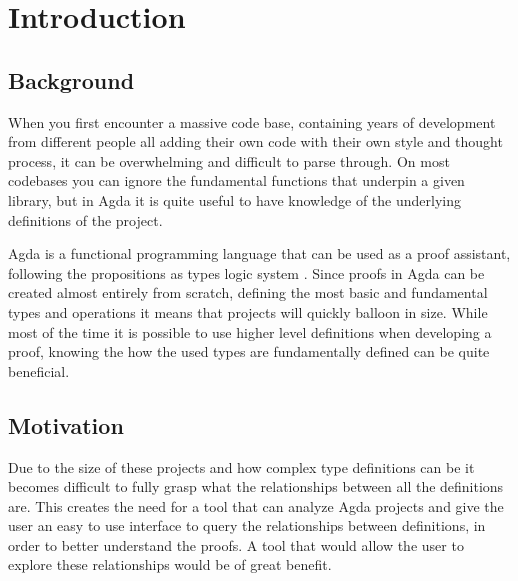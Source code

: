 
\chapter{Introduction}


\section{Background}

When you first encounter a massive code base, containing years of development
from different people all adding their own code with their own style and
thought process, it can be overwhelming and difficult to parse through. On most
codebases you can ignore the fundamental functions that underpin a given
library, but in Agda it is quite useful to have knowledge of the underlying
definitions of the project. 

Agda is a functional programming language that can be used as a proof
assistant, following the propositions as types logic system \cite{agda_docs}.
Since proofs in Agda can be created almost entirely from scratch, defining the
most basic and fundamental types and operations it means that projects will
quickly balloon in size. While most of the time it is possible to use higher
level definitions when developing a proof, knowing the how the used types are
fundamentally defined can be quite beneficial. 

\section{Motivation}

Due to the size of these projects and how complex type definitions can be it
becomes difficult to fully grasp what the relationships between all the
definitions are. This creates the need for a tool that can analyze Agda
projects and give the user an easy to use interface to query the relationships
between definitions, in order to better understand the proofs. A tool that
would allow the user to explore these relationships would be of great benefit.


